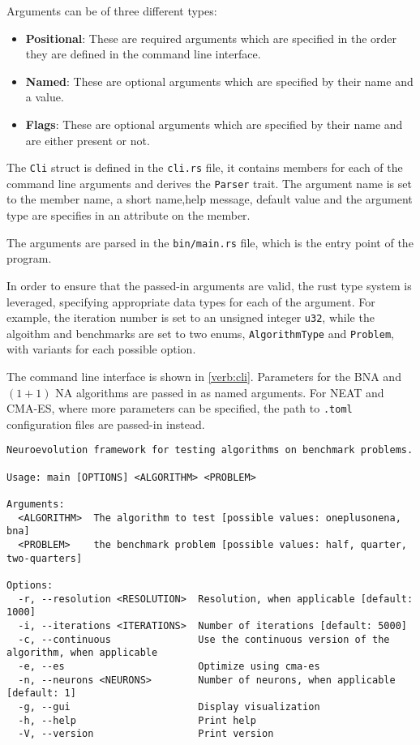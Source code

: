 Arguments can be of three different types:

\begin{itemize}
    \item \textbf{Positional}: These are required arguments which are specified in the order they are defined in the command line interface.
    \item \textbf{Named}: These are optional arguments which are specified by their name and a value.
    \item \textbf{Flags}: These are optional arguments which are specified by their name and are either present or not.
\end{itemize}

The \texttt{Cli} struct is defined in the \texttt{cli.rs} file, it contains members for each of the command line arguments and derives the \texttt{Parser} trait.
The argument name is set to the member name, a short name,help message, default value and the argument type are specifies in an attribute on the member.

The arguments are parsed in the \texttt{bin/main.rs} file, which is the entry point of the program.

In order to ensure that the passed-in arguments are valid, the rust type system is leveraged, specifying appropriate data types for each of the argument.
For example, the iteration number is set to an unsigned integer \texttt{u32}, while the algoithm and benchmarks are set to two enums, \texttt{AlgorithmType} and
\texttt{Problem}, with variants for each possible option.

The command line interface is shown in \ref{verb:cli}. Parameters for the BNA and $(1 + 1)$ NA algorithms are passed in as named arguments. For NEAT and CMA-ES, where more
parameters can be specified, the path to \texttt{.toml} configuration files are passed-in instead.


\begin{lstlisting}[label=verb:cli,caption=Command line interface,float,frame=tb]
Neuroevolution framework for testing algorithms on benchmark problems.

Usage: main [OPTIONS] <ALGORITHM> <PROBLEM>

Arguments:
  <ALGORITHM>  The algorithm to test [possible values: oneplusonena, bna]
  <PROBLEM>    the benchmark problem [possible values: half, quarter, two-quarters]

Options:
  -r, --resolution <RESOLUTION>  Resolution, when applicable [default: 1000]
  -i, --iterations <ITERATIONS>  Number of iterations [default: 5000]
  -c, --continuous               Use the continuous version of the algorithm, when applicable
  -e, --es                       Optimize using cma-es
  -n, --neurons <NEURONS>        Number of neurons, when applicable [default: 1]
  -g, --gui                      Display visualization
  -h, --help                     Print help
  -V, --version                  Print version
\end{lstlisting}


